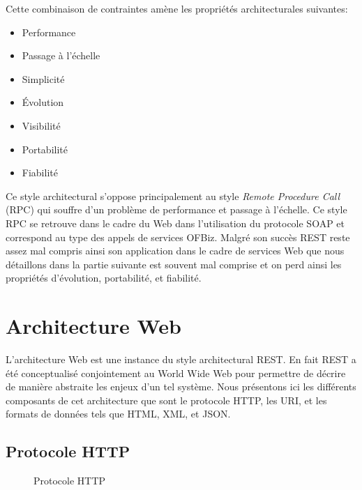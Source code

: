 \documentclass[a4paper, 11pt]{report}
\begin{document}
Cette combinaison de contraintes amène les propriétés architecturales
suivantes:
\begin{itemize}
\item Performance
\item Passage à l'échelle
\item Simplicité
\item Évolution
\item Visibilité
\item Portabilité
\item Fiabilité
\end{itemize}

Ce style architectural s'oppose principalement au style \emph{Remote
  Procedure Call} (RPC) qui souffre d'un problème de performance et
passage à l'échelle. Ce style RPC se retrouve dans le cadre du Web
dans l'utilisation du protocole SOAP \cite{box2000simple} et
correspond au type des appels de services OFBiz. Malgré son succès
REST reste assez mal compris ainsi son application dans le cadre de
services Web que nous détaillons dans la partie suivante est souvent
mal comprise et on perd ainsi les propriétés d'évolution, portabilité,
et fiabilité.

\section{Architecture Web}

L'architecture Web est une instance du style architectural REST. En
fait REST a été conceptualisé conjointement au World Wide Web pour
permettre de décrire de manière abstraite les enjeux d'un tel système.
Nous présentons ici les différents composants de cet architecture que
sont le protocole HTTP, les URI, et les formats de données tels que
HTML, XML, et JSON.

\subsection{Protocole HTTP}

\begin{figure}
  \centering
  \caption{Protocole HTTP}
  \label{fig:http}
\end{figure}
\end{document}
